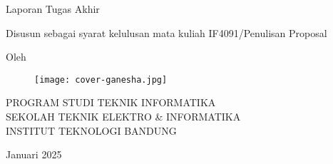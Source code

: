 \clearpage
\pagestyle{empty}

\begin{center}
	\smallskip

	\Large \bfseries \MakeUppercase{\thetitle}
	\vfill

	\Large Laporan Tugas Akhir
	\vfill

	\large Disusun sebagai syarat kelulusan mata kuliah \break IF4091/Penulisan Proposal
	\vfill

	\large Oleh

	\Large \theauthor

	\vfill
	\begin{figure}[ht]
		\centering
		\texttt{[image: cover-ganesha.jpg]}
	\end{figure}
	\vfill

	\large
	\uppercase{
		Program Studi Teknik Informatika \\
		Sekolah Teknik Elektro \& Informatika \\
		Institut Teknologi Bandung
	}

	Januari 2025

\end{center}

\clearpage
